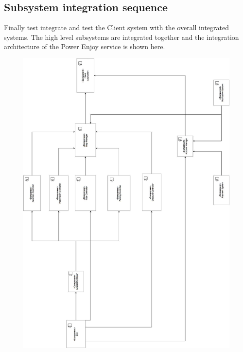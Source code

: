 \subsection{Subsystem integration sequence}
Finally test integrate and test the Client system with the overall integrated systems. The high level subsystems are integrated together and the integration architecture of the Power Enjoy service is shown here.

\begin{figure}[H]
	\centering
	\includegraphics[width=\linewidth,keepaspectratio]{figures/components_controller.eps}
	\label{fig:components_controller}
\end{figure}